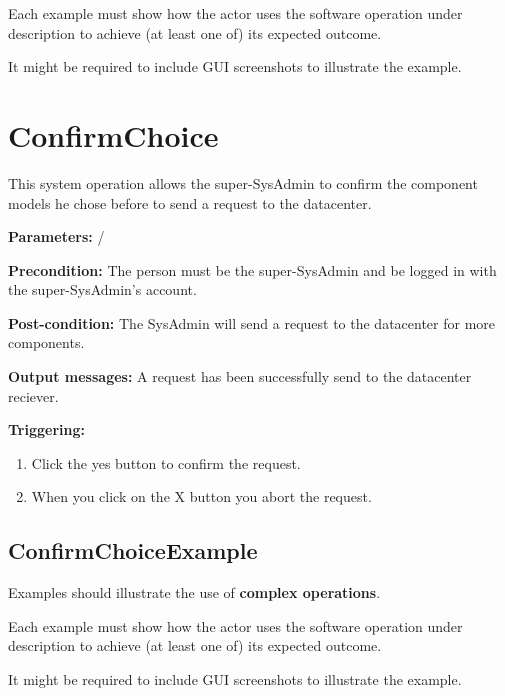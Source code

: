 Each example must show how the actor uses the software operation under
description to achieve (at least one of) its expected outcome.

It might be required to include GUI screenshots to illustrate the example.







\section{ConfirmChoice}
\label{operation:confirmchoice}
This system operation allows the super-SysAdmin to confirm the component models
he chose before to send a request to the datacenter.

\begin{description}

\item \textbf{Parameters:} /
\item \textbf{Precondition:} The person must be the super-SysAdmin and be logged
in with the super-SysAdmin's account.
\item \textbf{Post-condition:} The SysAdmin will send a request to the
datacenter for more components.
\item \textbf{Output messages:} A request has been successfully send to the
datacenter reciever.

\item \textbf{Triggering:}
\begin{enumerate}
\item Click the yes button to confirm the request.
\item When you click on the X button you abort the request.
\end{enumerate}

 
\end{description}

\subsection{ConfirmChoiceExample}
Examples should illustrate the use of \textbf{complex operations}.

Each example must show how the actor uses the software operation under
description to achieve (at least one of) its expected outcome.

It might be required to include GUI screenshots to illustrate the example.










